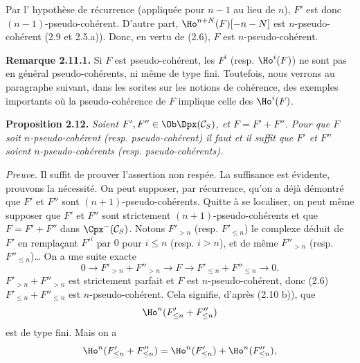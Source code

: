 Par l'%
hypothèse de récurrence (appliquée pour \(n-1\) au lieu de \(n\)), \(F'\) est donc \((n-1)\)-pseudo-cohérent. D'autre part, \(\Ho^{n+N}(F)[-n-N]\) est \(n\)-pseudo-cohérent (2.9 et 2.5.a)). Donc, en vertu de (2.6), \(F\) est \(n\)-pseudo-cohérent.

\textbf{Remarque 2.11.1.} Si \(F\) est pseudo-cohérent, les \(F^i\) (resp. \(\Ho^i(F)\)) ne sont pas en général pseudo-cohérents, ni même de type fini. Toutefois, nous verrons au paragraphe suivant, dans les sorites sur les notions de cohérence, des exemples importants où la pseudo-cohérence de \(F\) implique celle des \(\Ho^i(F)\).

\textbf{Proposition 2.12.} \emph{Soient \(F',F''\in\Ob\Dpx(\mathcal C_S)\), et \(F=F'+F''\). Pour que \(F\) soit \(n\)-pseudo-cohérent (resp. pseudo-cohérent) il faut et il suffit que \(F'\) et \(F''\) soient \(n\)-pseudo-cohérents (resp. pseudo-cohérents).}

\emph{Preuve.} Il suffit de prouver l'assertion non respée. La suffisance est évidente, prouvons la nécessité. On peut supposer, par récurrence, qu'on a déjà démontré que \(F'\) et \(F''\) sont \((n+1)\)-pseudo-cohérents. Quitte à se localiser, on peut même supposer que \(F'\) et \(F''\) sont strictement \((n+1)\)-pseudo-cohérents et que \(F=F'+F''\) dans \(\Cpx^-(\mathcal C_S)\). Notons \(F'_{>n}\) (resp. \(F'_{\leq n}\)) le complexe déduit de \(F'\) en remplaçant \(F'^i\) par \(0\) pour \(i\leq n\) (resp. \(i>n\)), et de même \(F''_{>n}\) (resp. \(F''_{\leq n}\))\dots{} On a une suite exacte
\[
  0\longrightarrow F'_{>n}+F''_{>n}\longrightarrow F
  \longrightarrow F'_{\leq n}+F''_{\leq n}\longrightarrow 0 .
\]
\(F'_{>n}+F''_{>n}\) est strictement parfait et \(F\) est \(n\)-pseudo-cohérent, donc (2.6) \(F'_{\leq n}+F''_{\leq n}\) est \(n\)-pseudo-cohérent. Cela signifie, d'après (2.10 b)), que
\[
  \Ho^n(F'_{\leq n}+F''_{\leq n})
\]
est de type fini. Mais on a
\[
  \Ho^n(F'_{\leq n}+F''_{\leq n})
  =\Ho^n(F'_{\leq n})+\Ho^n(F''_{\leq n}),
\]
